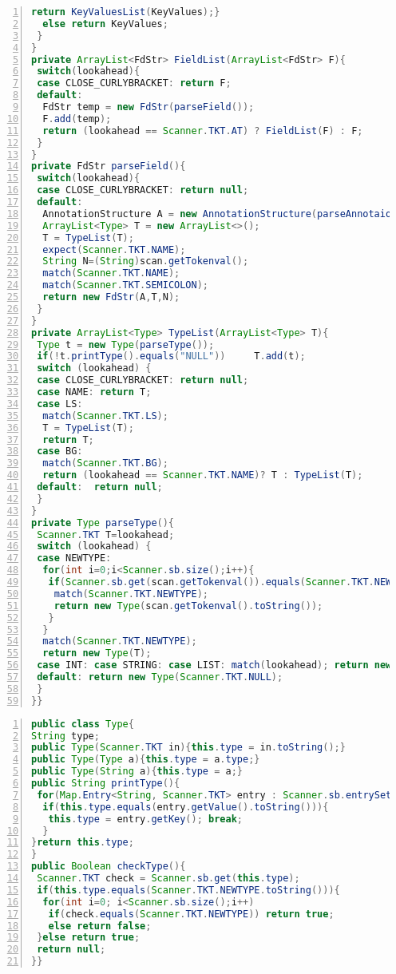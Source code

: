 \documentclass[10pt]{report}
\begin{document}
\begin{lstlisting}[numbers=left,language=Java,frame=single,breaklines=true,label=Code:Mutual, caption=Parser Class.]
   return KeyValuesList(KeyValues);}
  else return KeyValues;
 }
}
private ArrayList<FdStr> FieldList(ArrayList<FdStr> F){
 switch(lookahead){
 case CLOSE_CURLYBRACKET: return F;
 default:
  FdStr temp = new FdStr(parseField());
  F.add(temp);
  return (lookahead == Scanner.TKT.AT) ? FieldList(F) : F;
 }    
}
private FdStr parseField(){
 switch(lookahead){
 case CLOSE_CURLYBRACKET: return null; 
 default:
  AnnotationStructure A = new AnnotationStructure(parseAnnotaion());
  ArrayList<Type> T = new ArrayList<>();
  T = TypeList(T);
  expect(Scanner.TKT.NAME);
  String N=(String)scan.getTokenval();
  match(Scanner.TKT.NAME);
  match(Scanner.TKT.SEMICOLON);
  return new FdStr(A,T,N);
 }
}
private ArrayList<Type> TypeList(ArrayList<Type> T){
 Type t = new Type(parseType());
 if(!t.printType().equals("NULL"))     T.add(t);
 switch (lookahead) {
 case CLOSE_CURLYBRACKET: return null;
 case NAME: return T;
 case LS:
  match(Scanner.TKT.LS);
  T = TypeList(T);
  return T;
 case BG:
  match(Scanner.TKT.BG);
  return (lookahead == Scanner.TKT.NAME)? T : TypeList(T);
 default:  return null;
 }
}
private Type parseType(){
 Scanner.TKT T=lookahead;
 switch (lookahead) {
 case NEWTYPE: 
  for(int i=0;i<Scanner.sb.size();i++){
   if(Scanner.sb.get(scan.getTokenval()).equals(Scanner.TKT.NEWTYPE)){
    match(Scanner.TKT.NEWTYPE);
    return new Type(scan.getTokenval().toString());
   }
  }
  match(Scanner.TKT.NEWTYPE);
  return new Type(T);
 case INT: case STRING: case LIST: match(lookahead); return new Type(T);
 default: return new Type(Scanner.TKT.NULL);
 }
}}
\end{lstlisting}
\begin{lstlisting}[numbers=left,language=Java,frame=single,breaklines=true,label=Code:ZeroIn, caption=Type Class.]
public class Type{
String type;
public Type(Scanner.TKT in){this.type = in.toString();}
public Type(Type a){this.type = a.type;}
public Type(String a){this.type = a;}
public String printType(){
 for(Map.Entry<String, Scanner.TKT> entry : Scanner.sb.entrySet()){
  if(this.type.equals(entry.getValue().toString())){
   this.type = entry.getKey(); break;
  }
}return this.type;
}
public Boolean checkType(){
 Scanner.TKT check = Scanner.sb.get(this.type);
 if(this.type.equals(Scanner.TKT.NEWTYPE.toString())){
  for(int i=0; i<Scanner.sb.size();i++)
   if(check.equals(Scanner.TKT.NEWTYPE)) return true;
   else return false;
 }else return true;
 return null;
}}
\end{lstlisting}
\end{document}
